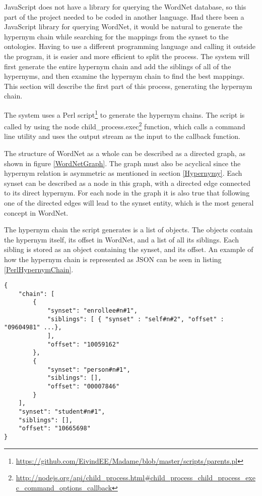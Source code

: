 JavaScript does not have a library for 	querying the WordNet database,
so this part of the project needed to be coded in another language.
Had there been a JavaScript library for querying WordNet,
it would be natural to generate the hypernym chain while searching for the mappings from the synset to the ontologies.
Having to use a different programming language and calling it outside the program,
it is easier and more efficient to split the process.
The system will first generate the entire hypernym chain and add the siblings of all of the hypernyms,
and then examine the hypernym chain to find the best mappings.
This section will describe the first part of this process, generating the hypernym chain.

The system uses a Perl script\footnote{\url{https://github.com/EivindEE/Madame/blob/master/scripts/parents.pl}} to generate the hypernym chains.
The script is called by using the node
child\_process.exec\footnote{\url{http://nodejs.org/api/child\_process.html\#child\_process\_child\_process\_exec\_command\_options\_callback}}
function, which calls a command line utility and uses the output stream as the input to the callback function.

The structure of WordNet as a whole can be described as a directed graph, as shown in figure \ref{WordNetGraph}.
The graph must also be acyclical since the hypernym relation is asymmetric as mentioned in section \ref{Hypernymy}.
Each synset can be described as a node in this graph, with a directed edge connected to its direct hypernym.
For each node in the graph it is also true that following one of the directed edges will lead to the synset entity,
which is the most general concept in WordNet.

The hypernym chain the script generates is a list of objects.
The objects contain the hypernym itself, its offset in WordNet, and a list of all its siblings.
Each sibling is stored as an object containing the synset, and its offset.
An example of how the hypernym chain is represented as JSON can be seen in listing \ref{PerlHypernymChain}.

\begin{lstlisting}[float=t, label=PerlHypernymChain, caption={Excerpt from the hypernym chain for student\#n\#1}]
{
	"chain": [
		{
			"synset": "enrollee#n#1",
			"siblings": [ { "synset" : "self#n#2", "offset" : "09604981" ...},
			],
			"offset": "10059162"
		},
		{
			"synset": "person#n#1",
			"siblings": [],
			"offset": "00007846"
		}
	],
	"synset": "student#n#1",
	"siblings": [],
	"offset": "10665698"
}
\end{lstlisting}

